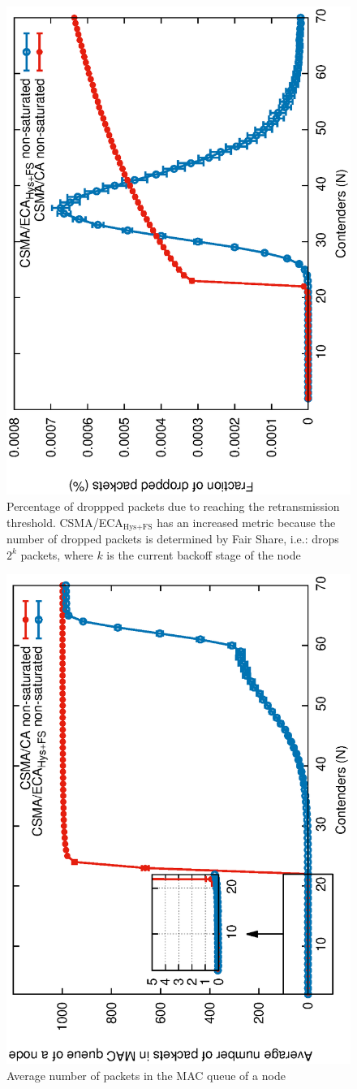    	\begin{figure}[tb]
		\centering
		\includegraphics[width=0.7\linewidth,angle=-90]{figures/unsaturated/droppedPackets/droppedPacketsDueRET-TON.eps}
		\caption{Percentage of droppped packets due to reaching the retransmission threshold. CSMA/ECA$_{\text{Hys+FS}}$ has an increased metric because the number of dropped packets is determined by Fair Share, i.e.: drops $2^{k}$ packets, where $k$ is the current backoff stage of the node}
		\label{fig:droppedDueToRET}
	\end{figure}
	
	 \begin{figure}[tb]
		\centering				
		\includegraphics[width=0.7\linewidth,angle=-90]{figures/unsaturated/queueSize/queueSize-multiplot-TON.eps}
		\caption{Average number of packets in the MAC queue of a node}
		\label{fig:MacQ}
	\end{figure}
	
